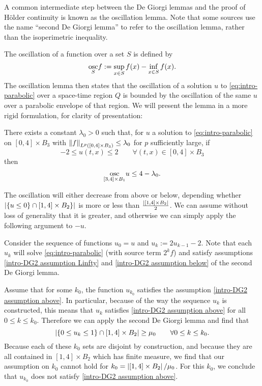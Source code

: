 
A common intermediate step between the De Giorgi lemmas and the proof of H\"{o}lder continuity is known as the oscillation lemma.  Note that some sources use the name ``second De Giorgi lemma'' to refer to the oscillation lemma, rather than the isoperimetric inequality.  

The oscillation of a function over a set $S$ is defined by 
\[ \underset{S}{\operatorname{osc}} f := \sup_{x \in S} f(x) - \inf_{x \in S} f(x). \]
The oscillation lemma then states that the oscillation of a solution $u$ to \eqref{eq:intro-parabolic} over a space-time region $Q$ is bounded by the oscillation of the same $u$ over a parabolic envelope of that region.  We will present the lemma in a more rigid formulation, for clarity of presentation:
\begin{lemma}
There exists a constant $\lambda_0 > 0$ such that, for $u$ a solution to \eqref{eq:intro-parabolic} on $[0,4]\times B_3$ with $\left\lVert f\right\rVert_{L^p([0,4]\times B_3)} \leq \lambda_0$ for $p$ sufficiently large, if
\[ -2 \leq u(t,x) \leq 2 \qquad \forall (t,x) \in [0,4] \times B_3 \]
then 
\[ \underset{[3,4] \times B_1}{\operatorname{osc}} u \leq 4-\lambda_0. \]
\end{lemma}

The oscillation will either decrease from above or below, depending whether $\left\lvert \{u \leq 0\} \cap [1,4]\times B_2\} \right\rvert$ is more or less than $\frac{\left\lvert [1,4]\times B_2 \right\rvert}{2}$.  We can assume without loss of generality that it is greater, and otherwise we can simply apply the following argument to $-u$.  

Consider the sequence of functions $u_0 = u$ and $u_k := 2u_{k-1} - 2$.  Note that each $u_k$ will solve \eqref{eq:intro-parabolic} (with source term $2^k f$) and satisfy assumptions \eqref{intro-DG2 assumption Linfty} and \eqref{intro-DG2 assumption below} of the second De Giorgi lemma.  

Assume that for some $k_0$, the function $u_{k_0}$ satisfies the assumption \eqref{intro-DG2 assumption above}.  In particular, because of the way the sequence $u_k$ is constructed, this means that $u_k$ satisfies \eqref{intro-DG2 assumption above} for all $0 \leq k \leq k_0$.  Therefore we can apply the second De Giorgi lemma and find that 
\[ \left\lvert \{0 \leq u_k \leq 1\} \cap [1,4] \times B_2 \right\rvert \geq \mu_0 \qquad \forall 0 \leq k \leq k_0. \]
Because each of these $k_0$ sets are disjoint by construction, and because they are all contained in $[1,4]\times B_2$ which has finite measure, we find that our assumption on $k_0$ cannot hold for $k_0 = \left\lvert [1,4]\times B_2 \right\rvert / \mu_0$.  For this $k_0$, we conclude that $u_{k_0}$ does not satisfy \eqref{intro-DG2 assumption above}.  

